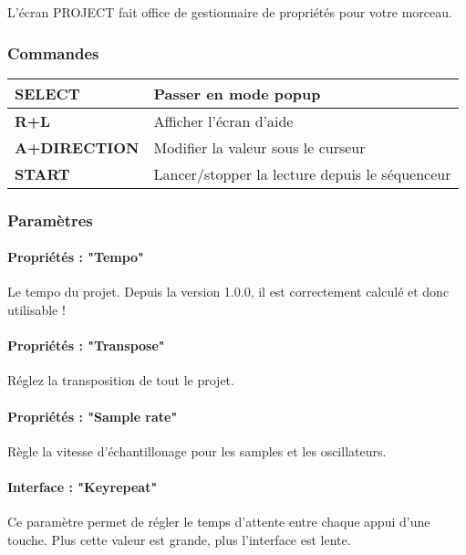L'écran PROJECT fait office de gestionnaire de propriétés pour votre morceau.


\subsubsection{Commandes}
\tablelasttail{\hline}
\begin{supertabular}{|l|p{11cm}|}
\hline
    {\bf SELECT} & Passer en mode popup \\
    \hline
    {\bf R+L} & Afficher l'écran d'aide \\
    \hline
    {\bf A+DIRECTION} & Modifier la valeur sous le curseur \\
    \hline
    {\bf START} & Lancer/stopper la lecture depuis le séquenceur \\
\end{supertabular}

\subsubsection{Paramètres}

\paragraph{Propriétés : "Tempo"} Le tempo du projet.
        Depuis la version 1.0.0, il est correctement calculé et donc utilisable !

\paragraph{Propriétés : "Transpose"} Réglez la transposition de tout le projet.

\paragraph{Propriétés : "Sample rate"} Règle la vitesse d'échantillonage pour les samples et les oscillateurs.

\paragraph{Interface : "Keyrepeat"} Ce paramètre permet de régler le temps d'attente entre chaque appui d'une touche.
                                    Plus cette valeur est grande, plus l'interface est lente.

